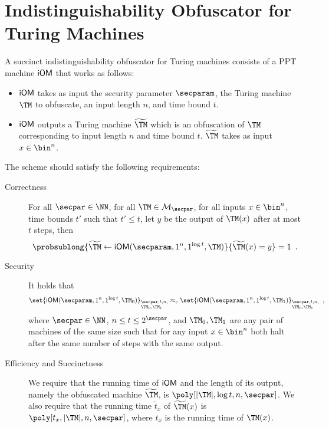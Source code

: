 
\section{Indistinguishability Obfuscator for Turing Machines}

\begin{definition}
		A succinct indistinguishability obfuscator for Turing machines  consists of a PPT machine $\mathsf{iOM}$ that works as follows:
		\begin{itemize}
			\item $\mathsf{iOM}$ takes as input the security parameter $\secparam$, the Turing machine $\TM$ to obfuscate, an input length $n$, and time bound $t$.
			\item $\mathsf{iOM}$ outputs a Turing machine $\widetilde{\TM}$ which is an obfuscation of $\TM$ corresponding to input length $n$ and time bound $t$. $\widetilde{\TM}$ takes as input $x \in \bin^n$.

		\end{itemize}
		The scheme should satisfy the following requirements:
		\begin{description}
			\item[Correctness] For all $\secpar \in \NN$, for all $\TM \in \mathcal{M}_\secpar$, for all inputs $x \in \bin^n$, time bounds $t'$ such that $t' \le t$, let $y$ be the output of $\TM(x)$ after at most $t$ steps, then
			\[
				\probsublong{\widetilde{\TM} \leftarrow \iOM(\secparam,1^n,1^{\log t},\TM)}{\widetilde{\TM}(x)=y} = 1\enspace.
			\]
			\item[Security] It holds that
			\[
						\set{\iOM(\secparam,1^n,1^{\log t},\TM_0)}_{\begin{subarray}{l}\secpar,t,n,\\ \TM_0,\TM_1\end{subarray}} \approx_c
							\set{\iOM(\secparam,1^n,1^{\log t},\TM_1)}_{\begin{subarray}{l}\secpar,t,n,\\ \TM_0,\TM_1\end{subarray}} \enspace,
			\]
			where $\secpar\in \NN$, $n\leq t\leq 2^{\secpar}$, and $\TM_0, \TM_1$ are any pair of machines of the same size such that for any input $x\in\bin^n$ both halt after the same number of steps with the same output.


			\item[Efficiency and Succinctness] We require that the running time of $\mathsf{iOM}$ and the length of its output, namely the obfuscated machine $\widetilde{\TM}$, is $\poly[|\TM|,\log t,n,\secpar]$. We also require that the running time $\tilde t_x$ of $\widetilde{\TM}(x)$ is $\poly[t_x,|\TM|, n,\secpar]$, where $t_x$ is the running time of $\TM(x)$.
		\end{description}
	\end{definition}

